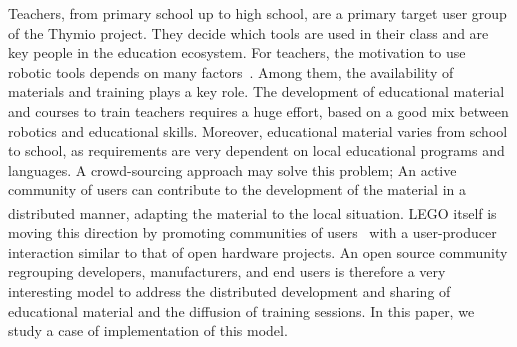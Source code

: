 \documentclass[letterpaper, 10 pt, conference]{ieeeconf}  %
\begin{document}
Teachers, from primary school up to high school, are a primary target user group of the Thymio project.
They decide which tools are used in their class and are key people in the education ecosystem.
For teachers, the motivation to use robotic tools depends on many factors~\cite{chevalier2016}.
Among them, the availability of materials and training plays a key role.
The development of educational material and courses to train teachers requires a huge effort, based on a good mix between robotics and educational skills. 
Moreover, educational material varies from school to school, as requirements are very dependent on local educational programs and languages. 
A crowd-sourcing approach may solve this problem; An active community of users can contribute to the development of the material in a distributed manner, adapting the material to the local situation.
LEGO\textsuperscript{\textregistered} itself is moving this direction by promoting communities of users~\cite{Hienerth2014} with a user-producer interaction similar to that of open hardware projects.
An open source community regrouping developers, manufacturers, and end users is therefore a very interesting model to address the distributed development and sharing of educational material and the diffusion of training sessions.
In this paper, we study a case of implementation of this model.
\end{document}
